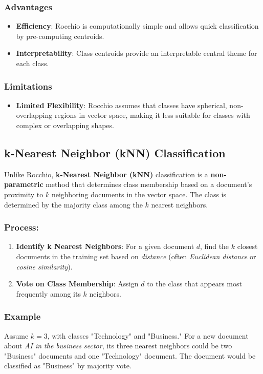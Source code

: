 \documentclass{article}
\begin{document}
\subsubsection*{Advantages}
\begin{itemize}
    \item \textbf{Efficiency}: Rocchio is computationally simple and allows quick classification by pre-computing centroids.
    \item \textbf{Interpretability}: Class centroids provide an interpretable central theme for each class.
\end{itemize}

\subsubsection*{Limitations}
\begin{itemize}
    \item \textbf{Limited Flexibility}: Rocchio assumes that classes have spherical, non-overlapping regions in vector space, making it less suitable for classes with complex or overlapping shapes.
\end{itemize}

\subsection{k-Nearest Neighbor (kNN) Classification}

Unlike Rocchio, \textbf{k-Nearest Neighbor (kNN)} classification is a \textbf{non-parametric} method that determines class membership based on a document's proximity to \(k\) neighboring documents in the vector space. The class is determined by the majority class among the \(k\) nearest neighbors.

\subsubsection*{Process:}
\begin{enumerate}
    \item \textbf{Identify k Nearest Neighbors}: For a given document \(d\), find the \(k\) closest documents in the training set based on \textit{distance} (often \textit{Euclidean distance} or \textit{cosine similarity}).
    \item \textbf{Vote on Class Membership}: Assign \(d\) to the class that appears most frequently among its \(k\) neighbors.
\end{enumerate}

\subsubsection*{Example}
Assume \(k=3\), with classes "Technology" and "Business." For a new document about \textit{AI in the business sector}, its three nearest neighbors could be two "Business" documents and one "Technology" document. The document would be classified as "Business" by majority vote.
\end{document}
